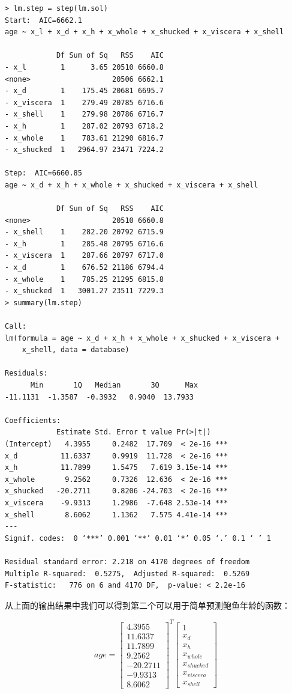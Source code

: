 \begin{verbatim}
> lm.step = step(lm.sol)
Start:  AIC=6662.1
age ~ x_l + x_d + x_h + x_whole + x_shucked + x_viscera + x_shell

            Df Sum of Sq   RSS    AIC
- x_l        1      3.65 20510 6660.8
<none>                   20506 6662.1
- x_d        1    175.45 20681 6695.7
- x_viscera  1    279.49 20785 6716.6
- x_shell    1    279.98 20786 6716.7
- x_h        1    287.02 20793 6718.2
- x_whole    1    783.61 21290 6816.7
- x_shucked  1   2964.97 23471 7224.2

Step:  AIC=6660.85
age ~ x_d + x_h + x_whole + x_shucked + x_viscera + x_shell

            Df Sum of Sq   RSS    AIC
<none>                   20510 6660.8
- x_shell    1    282.20 20792 6715.9
- x_h        1    285.48 20795 6716.6
- x_viscera  1    287.66 20797 6717.0
- x_d        1    676.52 21186 6794.4
- x_whole    1    785.25 21295 6815.8
- x_shucked  1   3001.27 23511 7229.3
> summary(lm.step)

Call:
lm(formula = age ~ x_d + x_h + x_whole + x_shucked + x_viscera + 
    x_shell, data = database)

Residuals:
      Min       1Q   Median       3Q      Max 
-11.1131  -1.3587  -0.3932   0.9040  13.7933 

Coefficients:
            Estimate Std. Error t value Pr(>|t|)    
(Intercept)   4.3955     0.2482  17.709  < 2e-16 ***
x_d          11.6337     0.9919  11.728  < 2e-16 ***
x_h          11.7899     1.5475   7.619 3.15e-14 ***
x_whole       9.2562     0.7326  12.636  < 2e-16 ***
x_shucked   -20.2711     0.8206 -24.703  < 2e-16 ***
x_viscera    -9.9313     1.2986  -7.648 2.53e-14 ***
x_shell       8.6062     1.1362   7.575 4.41e-14 ***
---
Signif. codes:  0 ‘***’ 0.001 ‘**’ 0.01 ‘*’ 0.05 ‘.’ 0.1 ‘ ’ 1

Residual standard error: 2.218 on 4170 degrees of freedom
Multiple R-squared:  0.5275,  Adjusted R-squared:  0.5269 
F-statistic:   776 on 6 and 4170 DF,  p-value: < 2.2e-16
\end{verbatim}

从上面的输出结果中我们可以得到第二个可以用于简单预测鲍鱼年龄的函数：

\begin{equation} \label{eq:step}
  age = \begin{bmatrix}   4.3955 \\ 11.6337 \\ 11.7899 \\  9.2562 \\-20.2711 \\ -9.9313 \\  8.6062 \end{bmatrix} ^{T} \begin{bmatrix} 1 \\ x_d \\ x_h \\ x_{whole} \\ x_{shucked} \\ x_{viscera} \\ x_{shell} \end{bmatrix}
\end{equation}

